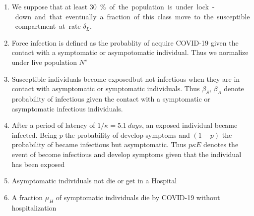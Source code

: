 \begin{hypotheses}
    \begin{enumerate}[(H-1)]
        \item
            We suppose that at least \SI{30}\percent  of the population is
            under lock-down and that eventually a fraction of this class move
            to the susceptible compartment at rate $\delta_L$.
        \item
            Force infection is defined as the probablity of acquire COVID-19
            given the contact with a symptomatic or asympotomatic individual.
            Thus we normalize under live population
            $
                N^{\star}
            $
        \item
            Susceptible individuals become
            exposed\textemdash but not infectious\textemdash
            when they are in contact with asymptomatic or symptomatic
            individuals. Thus $\beta_S$, $\beta_A$ denote
            probability of infectious given the contact with a symptomatic or
            asymptomatic infectious individuals.
        \item
            After a period of latency of $1/\kappa = \SI{5.1}{days}$, an
            exposed individual became infected. Being $p$ the probability of
            develop symptoms and $(1-p)$ the probability of became infectious
            but asymptomatic. Thus $p\kappa E$ denotes the
            event of become infectious and develop symptoms given that the
            individual has been exposed
        \item
            Asymptomatic individuals not die or get in a Hospital
        \item
            A fraction $\mu_{H}$ of symptomatic individuals
            die by COVID-19 without hospitalization
    \end{enumerate}
\end{hypotheses}




